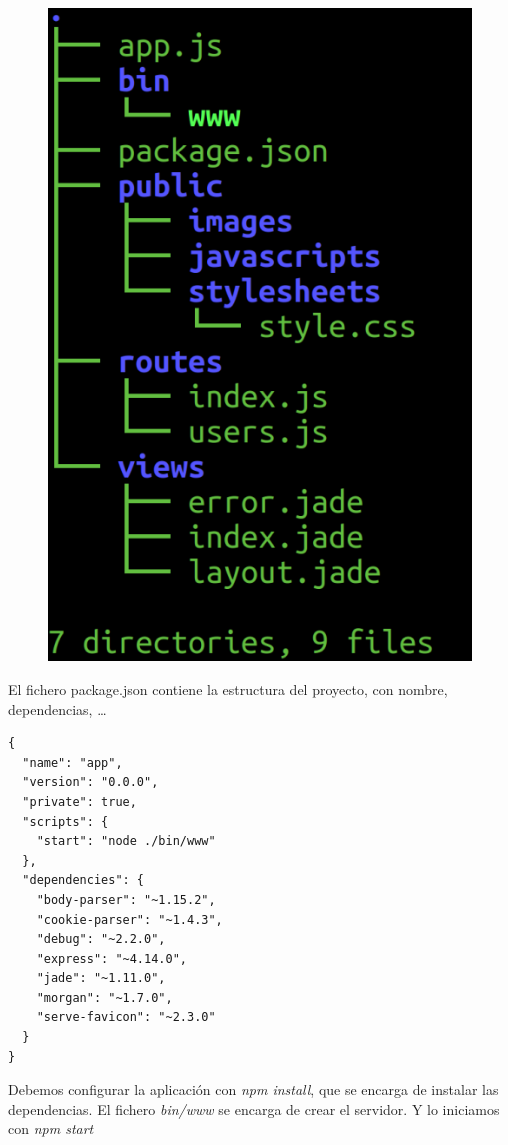 \documentclass[4paper]{article}
\begin{document}
\begin{figure}[H]
\includegraphics[scale=0.8]{../imagenes/tree.png}
\end{figure}
\newpage
El fichero package.json contiene la estructura del proyecto, con nombre, dependencias, \dots
\begin{verbatim}
{
  "name": "app",
  "version": "0.0.0",
  "private": true,
  "scripts": {
    "start": "node ./bin/www"
  },
  "dependencies": {
    "body-parser": "~1.15.2",
    "cookie-parser": "~1.4.3",
    "debug": "~2.2.0",
    "express": "~4.14.0",
    "jade": "~1.11.0",
    "morgan": "~1.7.0",
    "serve-favicon": "~2.3.0"
  }
}
\end{verbatim}
Debemos configurar la aplicación con\emph{ npm install}, que se encarga de instalar las dependencias. El fichero \emph{bin/www} se encarga de crear el servidor. Y lo iniciamos con \emph{npm start}
\end{document}
